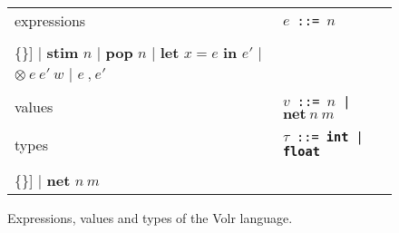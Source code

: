 \begin{figure}
  \begin{tabular}[t]{l l}
    expressions & \texttt{$e$ ::= $n$} \\
    & \begin{minipage}{0.6\textwidth}
      \begin{Verbatim}[mathescape,commandchars=\\\{\}]
    | \textbf{stim} $n$
    | \textbf{pop} $n$
    | \textbf{let} $x = e$ \textbf{in} $e'$
    | $\otimes\ e\ e'\ w$
    | $e\ \textbf{,}\ e'$
      \end{Verbatim} 
      \end{minipage} \\

    & \\ %

    values
    & \texttt{$v$ ::= $n$ | $\textbf{net}\ n\ m$} \\
    
    & \\ %
    types
    & \texttt{$\tau$ ::= \textbf{int} | \textbf{float}} \\
    & \begin{minipage}{0.6\textwidth}
      \begin{Verbatim}[mathescape,commandchars=\\\{\}]
    | \textbf{net} $n\ m$
      \end{Verbatim}
    \end{minipage}
  \end{tabular}

  \caption{Expressions, values and types of the Volr language.}
  \label{fig:volr-expr}
\end{figure}
